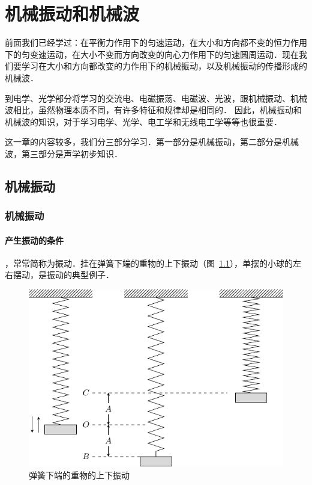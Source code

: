 \chapter{机械振动和机械波}\label{chapter-mechanical-vibration-and-wave}


前面我们已经学过：在平衡力作用下的匀速运动，在大小和方向都不变的恒力作用下的匀变速运动，在大小不变而方向改变的向心力作用下的匀速圆周运动．现在我们要学习在大小和方向都改变的力作用下的机械振动，以及机械振动的传播形成的机械波．

到电学、光学部分将学习的交流电、电磁振荡、电磁波、光波，跟机械振动、机械波相比，虽然物理本质不同，有许多特征和规律却是相同的．
因此，机械振动和机械波的知识，对于学习电学、光学、电工学和无线电工学等等也很重要．

这一章的内容较多，我们分三部分学习．第一部分是机械振动，第二部分是机械波，第三部分是声学初步知识．


\section{机械振动}
\subsection{机械振动}

\subsubsection{产生振动的条件} 

，常常简称为振动．挂在弹簧下端的重物的上下振动（图~\ref{fig_A_9-1}），单摆的小球的左右摆动，是振动的典型例子．

\begin{figure}[htbp]
	\centering
	\includegraphics{fig/A/9-1.pdf}
	\caption{弹簧下端的重物的上下振动}\label{fig_A_9-1}
\end{figure}


